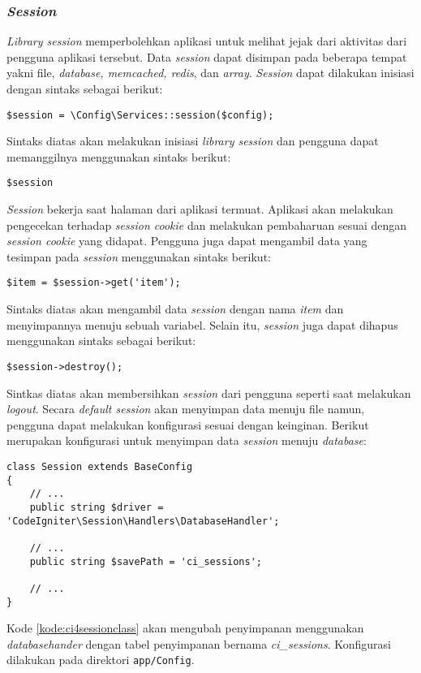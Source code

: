 \subsubsection{\textit{Session}}
\textit{Library session} memperbolehkan aplikasi untuk melihat jejak dari aktivitas dari pengguna aplikasi tersebut. Data \textit{session} dapat disimpan pada beberapa tempat yakni file, \textit{database, memcached, redis}, dan \textit{array}. \textit{Session} dapat dilakukan inisiasi dengan sintaks sebagai berikut:
\begin{center}
	\verb|$session = \Config\Services::session($config);|
\end{center}
Sintaks diatas akan melakukan inisiasi \textit{library session} dan pengguna dapat memanggilnya menggunakan sintaks berikut:
\begin{center}
	\verb|$session|
\end{center}
\textit{Session} bekerja saat halaman dari aplikasi termuat. Aplikasi akan melakukan pengecekan terhadap \textit{session cookie} dan melakukan pembaharuan sesuai dengan \textit{session cookie} yang didapat. Pengguna juga dapat mengambil data yang tesimpan pada \textit{session} menggunakan sintaks berikut:
\begin{center}
	\verb|$item = $session->get('item');|
\end{center}
Sintaks diatas akan mengambil data \textit{session} dengan nama \textit{item} dan menyimpannya menuju sebuah variabel. Selain itu, \textit{session} juga dapat dihapus menggunakan sintaks sebagai berikut:
\begin{center}
	\verb|$session->destroy();|
\end{center}
Sintkas diatas akan membersihkan \textit{session} dari pengguna seperti saat melakukan \textit{logout}. Secara \textit{default session} akan menyimpan data menuju file namun, pengguna dapat melakukan konfigurasi sesuai dengan keinginan. Berikut merupakan konfigurasi untuk menyimpan data \textit{session} menuju \textit{database}:
\begin{lstlisting}[caption=Contoh kode untuk konfigurasi penyimpanan \textit{session}. ,label=kode:ci4sessionclass]
class Session extends BaseConfig
{
    // ...
    public string $driver = 'CodeIgniter\Session\Handlers\DatabaseHandler';

    // ...
    public string $savePath = 'ci_sessions';

    // ...
}
\end{lstlisting}
Kode \ref{kode:ci4sessionclass} akan mengubah penyimpanan menggunakan \textit{databasehander} dengan tabel penyimpanan bernama \textit{ci\_sessions}. Konfigurasi dilakukan pada direktori \texttt{app/Config}.

